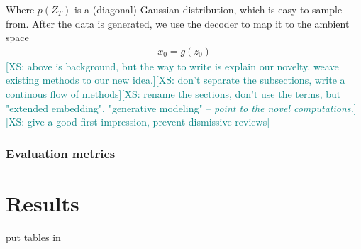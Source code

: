 \documentclass{article}
\theoremstyle{plain}
\theoremstyle{definition}
\theoremstyle{remark}
\newcommand{\xin}[1]{\textcolor{teal}{[XS: #1]}}
\begin{document}
Where $p(Z_T)$ is a (diagonal) Gaussian distribution, which is easy to sample from.
After the data is generated, we use the decoder to map it to the ambient space
\begin{align}
    x_0=g(z_0)
\end{align}
\xin{above is background, but the way to write is explain our novelty. weave existing methods to our new idea.}\xin{don't separate the subsections, write a continous flow of methods}\xin{rename the sections, don't use the terms, but "extended embedding", "generative modeling" -- \emph{point to the novel computations.}}\xin{give a good first impression, prevent dismissive reviews}
\begin{comment}
\par This is a brief explanation for DDPM, \xin{need to explain notations}\xin{move to appendix?}
\begin{itemize}
    \item Markov noising process
    \begin{align*}
        X_i=\sqrt{1-\beta_i}X_{i-1}+\sqrt{\beta_i}Z
    \end{align*}
    \item Neural reverse process
    \begin{align*}
        X_{i-1}=\frac{1}{\sqrt{1-\beta_i}}(X_i+\beta_i s_\theta(X_i,i))+\sqrt{\beta_i}Z
    \end{align*}
    \item Score matching objective
    \begin{align*}
        &p_{\alpha_i}\left(X_i \mid X_0\right)=\mathcal{N}\left(X_i ; \sqrt{\alpha_i} X_0,\left(1-\alpha_i\right) {I}\right)\\
        &\mathcal L(\theta)=\sum_{i=1}^N\left(1-\alpha_i\right) \mathbb{E}_{p_{}(X)} \mathbb{E}_{p_{\alpha_i}(\tilde{X} \mid X)}\left[\left\|{s}_{{\theta}}(\tilde{X}, i)-\nabla\log p_{\alpha_i}(\tilde{X} \mid X)\right\|_2^2\right]
    \end{align*}
\end{itemize}
\end{comment}

\subsubsection{Evaluation metrics}


\section{Results}
put tables in
\end{document}
